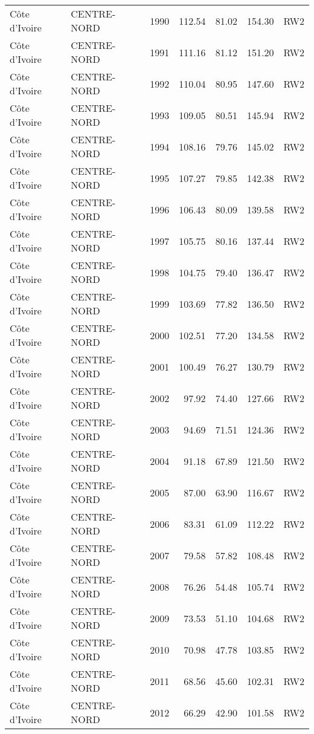 \begin{longtable}{lllrrrl}
  C\^{o}te d'Ivoire & CENTRE-NORD & 1990 & 112.54 & 81.02 & 154.30 & RW2 \\ 
  C\^{o}te d'Ivoire & CENTRE-NORD & 1991 & 111.16 & 81.12 & 151.20 & RW2 \\ 
  C\^{o}te d'Ivoire & CENTRE-NORD & 1992 & 110.04 & 80.95 & 147.60 & RW2 \\ 
  C\^{o}te d'Ivoire & CENTRE-NORD & 1993 & 109.05 & 80.51 & 145.94 & RW2 \\ 
  C\^{o}te d'Ivoire & CENTRE-NORD & 1994 & 108.16 & 79.76 & 145.02 & RW2 \\ 
  C\^{o}te d'Ivoire & CENTRE-NORD & 1995 & 107.27 & 79.85 & 142.38 & RW2 \\ 
  C\^{o}te d'Ivoire & CENTRE-NORD & 1996 & 106.43 & 80.09 & 139.58 & RW2 \\ 
  C\^{o}te d'Ivoire & CENTRE-NORD & 1997 & 105.75 & 80.16 & 137.44 & RW2 \\ 
  C\^{o}te d'Ivoire & CENTRE-NORD & 1998 & 104.75 & 79.40 & 136.47 & RW2 \\ 
  C\^{o}te d'Ivoire & CENTRE-NORD & 1999 & 103.69 & 77.82 & 136.50 & RW2 \\ 
  C\^{o}te d'Ivoire & CENTRE-NORD & 2000 & 102.51 & 77.20 & 134.58 & RW2 \\ 
  C\^{o}te d'Ivoire & CENTRE-NORD & 2001 & 100.49 & 76.27 & 130.79 & RW2 \\ 
  C\^{o}te d'Ivoire & CENTRE-NORD & 2002 & 97.92 & 74.40 & 127.66 & RW2 \\ 
  C\^{o}te d'Ivoire & CENTRE-NORD & 2003 & 94.69 & 71.51 & 124.36 & RW2 \\ 
  C\^{o}te d'Ivoire & CENTRE-NORD & 2004 & 91.18 & 67.89 & 121.50 & RW2 \\ 
  C\^{o}te d'Ivoire & CENTRE-NORD & 2005 & 87.00 & 63.90 & 116.67 & RW2 \\ 
  C\^{o}te d'Ivoire & CENTRE-NORD & 2006 & 83.31 & 61.09 & 112.22 & RW2 \\ 
  C\^{o}te d'Ivoire & CENTRE-NORD & 2007 & 79.58 & 57.82 & 108.48 & RW2 \\ 
  C\^{o}te d'Ivoire & CENTRE-NORD & 2008 & 76.26 & 54.48 & 105.74 & RW2 \\ 
  C\^{o}te d'Ivoire & CENTRE-NORD & 2009 & 73.53 & 51.10 & 104.68 & RW2 \\ 
  C\^{o}te d'Ivoire & CENTRE-NORD & 2010 & 70.98 & 47.78 & 103.85 & RW2 \\ 
  C\^{o}te d'Ivoire & CENTRE-NORD & 2011 & 68.56 & 45.60 & 102.31 & RW2 \\ 
  C\^{o}te d'Ivoire & CENTRE-NORD & 2012 & 66.29 & 42.90 & 101.58 & RW2 \\ 

\end{longtable}
